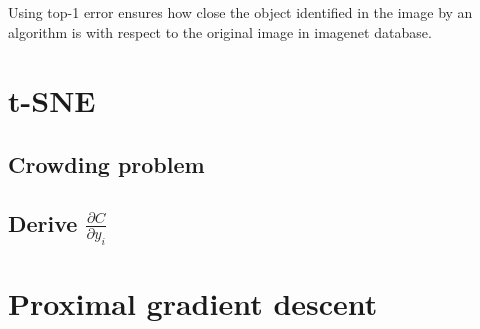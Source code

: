 \documentclass{article}
\begin{document}
Using top-1 error ensures how close the object identified in the image by an algorithm is with respect to the original image in imagenet database.

\section{t-SNE}
\subsection{Crowding problem}
\subsection{Derive $\frac{\partial C}{\partial y_{i}}$}

\section{Proximal gradient descent}



\end{document}
